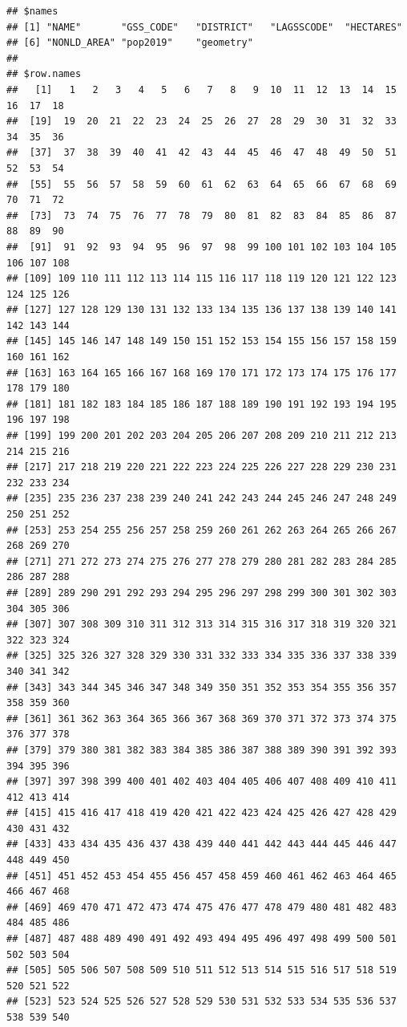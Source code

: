 \documentclass[
]{book}
\begin{document}
\begin{verbatim}
## $names
## [1] "NAME"       "GSS_CODE"   "DISTRICT"   "LAGSSCODE"  "HECTARES"  
## [6] "NONLD_AREA" "pop2019"    "geometry"  
## 
## $row.names
##   [1]   1   2   3   4   5   6   7   8   9  10  11  12  13  14  15  16  17  18
##  [19]  19  20  21  22  23  24  25  26  27  28  29  30  31  32  33  34  35  36
##  [37]  37  38  39  40  41  42  43  44  45  46  47  48  49  50  51  52  53  54
##  [55]  55  56  57  58  59  60  61  62  63  64  65  66  67  68  69  70  71  72
##  [73]  73  74  75  76  77  78  79  80  81  82  83  84  85  86  87  88  89  90
##  [91]  91  92  93  94  95  96  97  98  99 100 101 102 103 104 105 106 107 108
## [109] 109 110 111 112 113 114 115 116 117 118 119 120 121 122 123 124 125 126
## [127] 127 128 129 130 131 132 133 134 135 136 137 138 139 140 141 142 143 144
## [145] 145 146 147 148 149 150 151 152 153 154 155 156 157 158 159 160 161 162
## [163] 163 164 165 166 167 168 169 170 171 172 173 174 175 176 177 178 179 180
## [181] 181 182 183 184 185 186 187 188 189 190 191 192 193 194 195 196 197 198
## [199] 199 200 201 202 203 204 205 206 207 208 209 210 211 212 213 214 215 216
## [217] 217 218 219 220 221 222 223 224 225 226 227 228 229 230 231 232 233 234
## [235] 235 236 237 238 239 240 241 242 243 244 245 246 247 248 249 250 251 252
## [253] 253 254 255 256 257 258 259 260 261 262 263 264 265 266 267 268 269 270
## [271] 271 272 273 274 275 276 277 278 279 280 281 282 283 284 285 286 287 288
## [289] 289 290 291 292 293 294 295 296 297 298 299 300 301 302 303 304 305 306
## [307] 307 308 309 310 311 312 313 314 315 316 317 318 319 320 321 322 323 324
## [325] 325 326 327 328 329 330 331 332 333 334 335 336 337 338 339 340 341 342
## [343] 343 344 345 346 347 348 349 350 351 352 353 354 355 356 357 358 359 360
## [361] 361 362 363 364 365 366 367 368 369 370 371 372 373 374 375 376 377 378
## [379] 379 380 381 382 383 384 385 386 387 388 389 390 391 392 393 394 395 396
## [397] 397 398 399 400 401 402 403 404 405 406 407 408 409 410 411 412 413 414
## [415] 415 416 417 418 419 420 421 422 423 424 425 426 427 428 429 430 431 432
## [433] 433 434 435 436 437 438 439 440 441 442 443 444 445 446 447 448 449 450
## [451] 451 452 453 454 455 456 457 458 459 460 461 462 463 464 465 466 467 468
## [469] 469 470 471 472 473 474 475 476 477 478 479 480 481 482 483 484 485 486
## [487] 487 488 489 490 491 492 493 494 495 496 497 498 499 500 501 502 503 504
## [505] 505 506 507 508 509 510 511 512 513 514 515 516 517 518 519 520 521 522
## [523] 523 524 525 526 527 528 529 530 531 532 533 534 535 536 537 538 539 540

\end{verbatim}
\end{document}
